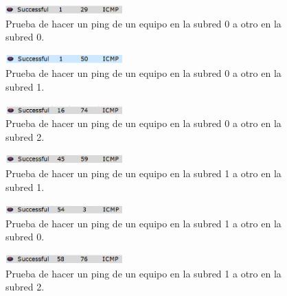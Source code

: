 \documentclass[../main.tex]{subfiles}
\begin{document}
\begin{figure}[H]
  \centering
  \includegraphics[width=0.4\textwidth]{images/test1.PNG}
  \caption{Prueba de hacer un ping de un equipo en la subred 0 a otro en la subred 0.}\label{fig:t1}
\end{figure}

\begin{figure}[H]
  \centering
  \includegraphics[width=0.4\textwidth]{images/test2.PNG}
  \caption{Prueba de hacer un ping de un equipo en la subred 0 a otro en la subred 1.}\label{fig:t2}
\end{figure}

\begin{figure}[H]
  \centering
  \includegraphics[width=0.4\textwidth]{images/test3.PNG}
  \caption{Prueba de hacer un ping de un equipo en la subred 0 a otro en la subred 2.}\label{fig:t3}
\end{figure}

\begin{figure}[H]
  \centering
  \includegraphics[width=0.4\textwidth]{images/test4.PNG}
  \caption{Prueba de hacer un ping de un equipo en la subred 1 a otro en la subred 1.}\label{fig:t4}
\end{figure}

\begin{figure}[H]
  \centering
  \includegraphics[width=0.4\textwidth]{images/test5.PNG}
  \caption{Prueba de hacer un ping de un equipo en la subred 1 a otro en la subred 0.}\label{fig:t5}
\end{figure}

\begin{figure}[H]
  \centering
  \includegraphics[width=0.4\textwidth]{images/test6.PNG}
  \caption{Prueba de hacer un ping de un equipo en la subred 1 a otro en la subred 2.}\label{fig:t6}
\end{figure}
\end{document}
